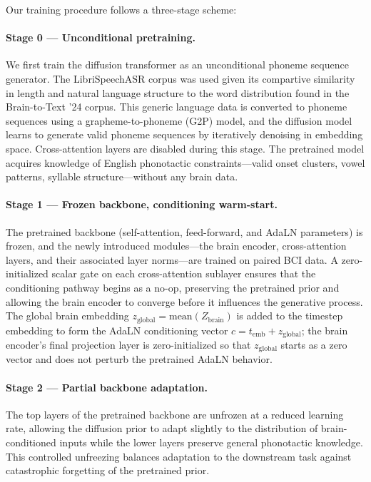 \documentclass{article}
\begin{document}
Our training procedure follows a three-stage scheme:
 
\paragraph{Stage 0 --- Unconditional pretraining.}
We first train the diffusion transformer as an unconditional phoneme
sequence generator.  The LibriSpeechASR corpus was used given its compartive similarity
in length and natural language structure to the word distribution found in the Brain-to-Text '24 corpus.
This generic language data is converted to
phoneme sequences using a grapheme-to-phoneme (G2P) model, and the
diffusion model learns to generate valid phoneme sequences by
iteratively denoising in embedding space.  Cross-attention layers are
disabled during this stage.  The pretrained model acquires knowledge
of English phonotactic constraints---valid onset clusters, vowel
patterns, syllable structure---without any brain data.
 
\paragraph{Stage 1 --- Frozen backbone, conditioning warm-start.}
The pretrained backbone (self-attention, feed-forward, and AdaLN
parameters) is frozen, and the newly introduced modules---the brain
encoder, cross-attention layers, and their associated layer
norms---are trained on paired BCI data.  A zero-initialized scalar
gate on each cross-attention sublayer ensures that the conditioning
pathway begins as a no-op, preserving the pretrained prior and
allowing the brain encoder to converge before it influences the
generative process.  The global brain embedding
$z_{\text{global}} = \mathrm{mean}(Z_{\text{brain}})$ is added to the
timestep embedding to form the AdaLN conditioning vector
$c = t_{\text{emb}} + z_{\text{global}}$; the brain encoder's final
projection layer is zero-initialized so that $z_{\text{global}}$
starts as a zero vector and does not perturb the pretrained AdaLN
behavior.
 
\paragraph{Stage 2 --- Partial backbone adaptation.}
The top layers of the pretrained backbone are unfrozen at a reduced
learning rate, allowing the diffusion prior to adapt slightly to the
distribution of brain-conditioned inputs while the lower layers
preserve general phonotactic knowledge.  This controlled unfreezing
balances adaptation to the downstream task against catastrophic
forgetting of the pretrained prior.
 
\end{document}
